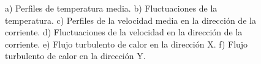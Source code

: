 \begin{figure}[H]
    
   \caption{a) Perfiles de temperatura media. b) Fluctuaciones de la temperatura. c) Perfiles de la velocidad media en la dirección de la corriente. d) Fluctuaciones de la velocidad en la dirección de la corriente. e) Flujo turbulento de calor en la dirección X. f) Flujo turbulento de calor en la dirección Y.} 
 
 \label{fig:guo}
\end{figure}
